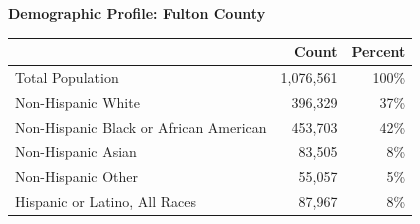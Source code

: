 \documentclass{article}
\begin{document}
\begin{center}
\LARGE{\textbf{Demographic Profile: Fulton County}}\\
\end{center}

\begin{tabular}{| p{4in} || r | r | }

\hline
& \textbf{Count} & \textbf{Percent} \\
\hline
Total Population & 1,076,561 & 100\% \\ 
\hline
Non-Hispanic White & 396,329 & 37\% \\
\hline
Non-Hispanic Black or African American & 453,703 & 42\% \\
\hline
Non-Hispanic Asian & 83,505 & 8\% \\
\hline
Non-Hispanic Other & 55,057 & 5\% \\
\hline
Hispanic or Latino, All Races & 87,967 & 8\%\\
\hline

\end{tabular}
\end{document}
